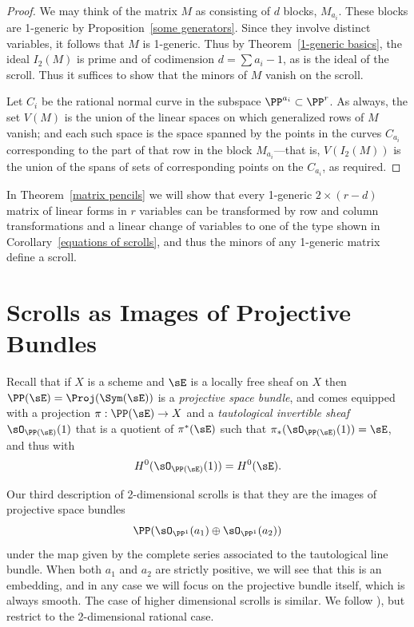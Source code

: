 \begin{proof} We may think of the matrix $M$ as consisting of $d$ blocks, $M_{a_{i}}$. These blocks are 1-generic by Proposition~\ref{some generators}. Since they involve distinct variables, it follows that $M$ is 1-generic. Thus by
Theorem~\ref{1-generic basics}, the ideal $I_{2}(M)$ is prime and of codimension $d = \sum a_{i}-1$, as is the ideal of the scroll. Thus it suffices to show that the minors of $M$ vanish on the scroll.

Let $C_{i}$ be the rational normal curve in the subspace $\PP^{a_{i}}\subset\PP^{r}$.
As always, the set $V(M)$ is the union of the linear spaces on which generalized rows of $M$ vanish; and each such space is the space spanned by the points in the curves $C_{a_{i}}$ corresponding to the part of that row in the block $M_{a_{i}}$---that is, $V(I_{2}(M))$ is the union of the spans of sets of corresponding points on the $C_{a_{i}}$, as required.
\end{proof}

 In Theorem~\ref{matrix pencils} we will show that every
 1-generic $2 \times (r-d)$ matrix of linear forms in $r$ variables can be transformed by row and column transformations and a linear change
 of variables to one of the type shown in
Corollary~\ref{equations of scrolls}, and thus the minors of any 1-generic matrix define a scroll.

 



\section{Scrolls as Images of Projective Bundles}\label{inscrutable name}

Recall that if $X$ is a scheme and $\sE$ is a locally free sheaf on $X$ then $\PP(\sE) = \Proj(\Sym(\sE))$ is a \emph{projective space bundle}, and comes equipped with a projection $\pi: \PP(\sE) \to X$ and a \emph{tautological invertible sheaf} $\sO_{\PP(\sE)}(1)$ that is a quotient of $\pi^{*}(\sE)$ such that $\pi_{*}(\sO_{\PP(\sE)}(1)) = \sE$, and thus with
$$
H^{0}(\sO_{\PP(\sE)}(1)) = H^{0}(\sE).
$$

Our third description of 2-dimensional scrolls is that they are the images of projective space bundles 
$$
\PP(\sO_{\PP^{1}}(a_{1})\oplus \sO_{\PP^{1}}(a_{2}))
$$ 
under the map given by the complete series associated to the tautological line bundle. When both $a_{1}$ and $a_{2}$ are strictly positive, we will see that this is an embedding, and in any case we will focus on the projective bundle itself, which is always smooth. The case of higher dimensional scrolls is similar. We follow  \cite[Chapter V]{Hartshorne1977}), but restrict
to the 2-dimensional rational case. 

